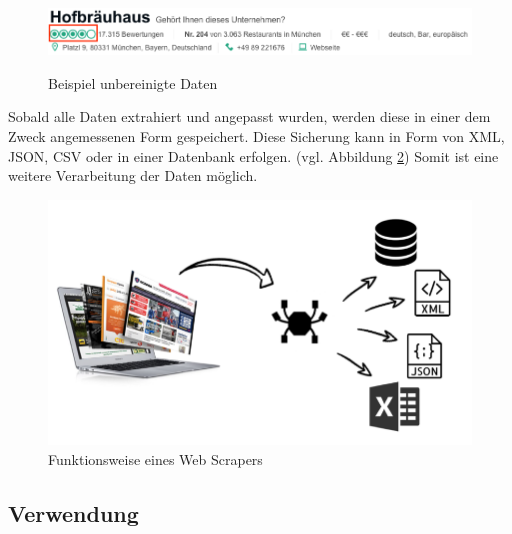 \documentclass[a4paper,oneside,12pt]{report}
\begin{document}
				\begin{figure}[H]
					\centering
					\begin{minipage}[b]{0.9\textwidth}
						\includegraphics[width=\textwidth]{Bilder/BeispielAnzahlSterne.png}
					\end{minipage}
					\centering
					\caption[Beispiel unbereinigte Daten]{Beispiel unbereinigte Daten} \cite{bib-anzSterne}
					\label{pic-anzSterne}
				\end{figure}
							
				Sobald alle Daten extrahiert und angepasst wurden, werden diese in einer dem Zweck angemessenen Form gespeichert. Diese Sicherung kann in Form von XML, JSON, CSV oder in einer Datenbank erfolgen. (vgl. Abbildung \ref{pic-webscraper2}) Somit ist eine weitere Verarbeitung der Daten möglich. \cite{bib-scrapehero}
				
				\begin{figure}[H]
					\centering
					\begin{minipage}[b]{0.6\textwidth}
						\includegraphics[width=\textwidth]{Bilder/Webcrawler.png}
					\end{minipage}
					\centering
					\caption[Funktionsweise eines Web Scrapers]{Funktionsweise eines Web Scrapers}
					\label{pic-webscraper2}
				\end{figure}
			
			
			\subsection{Verwendung}
			
\end{document}

